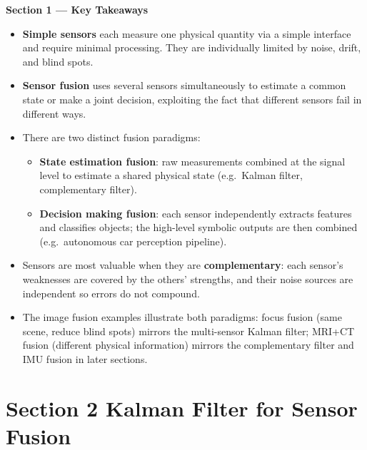 \documentclass[12pt, a4paper]{article}
\begin{document}
\begin{keybox}
  \textbf{Section 1 --- Key Takeaways}
  \begin{itemize}[leftmargin=1.2em, itemsep=2pt]
    \item \textbf{Simple sensors} each measure one physical quantity via a
      simple interface and require minimal processing.
      They are individually limited by noise, drift, and blind spots.

    \item \textbf{Sensor fusion} uses several sensors simultaneously to
      estimate a common state or make a joint decision, exploiting the fact
      that different sensors fail in different ways.

    \item There are two distinct fusion paradigms:
      \begin{itemize}[leftmargin=1.2em, itemsep=1pt]
        \item \textbf{State estimation fusion}: raw measurements combined at
          the signal level to estimate a shared physical state
          (e.g.\ Kalman filter, complementary filter).
        \item \textbf{Decision making fusion}: each sensor independently
          extracts features and classifies objects; the high-level symbolic
          outputs are then combined (e.g.\ autonomous car perception pipeline).
      \end{itemize}

    \item Sensors are most valuable when they are \textbf{complementary}:
      each sensor's weaknesses are covered by the others' strengths, and their
      noise sources are independent so errors do not compound.

    \item The image fusion examples illustrate both paradigms:
      focus fusion (same scene, reduce blind spots) mirrors the multi-sensor
      Kalman filter; MRI+CT fusion (different physical information) mirrors the
      complementary filter and IMU fusion in later sections.
  \end{itemize}
\end{keybox}

\newpage
\section*{Section 2 \quad Kalman Filter for Sensor Fusion}
\end{document}
